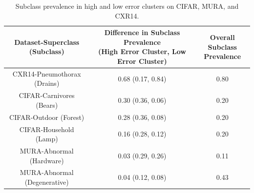\documentclass[sigconf,anonymous,review]{acmart}
\begin{document}
 \begin{table}[]
 \centering
\begin{tabular}{ccc}
\toprule
 Dataset-Superclass (Subclass) & \makecell{Difference in Subclass Prevalence \\ (High Error Cluster, Low Error Cluster)}  & \makecell{Overall Subclass \\ Prevalence} \\
 \toprule
 CXR14-Pneumothorax (Drains) & 0.68 (0.17, 0.84) & 0.80\\
 CIFAR-Carnivores (Bears) & 0.30 (0.36, 0.06) & 0.20\\
 CIFAR-Outdoor (Forest) & 0.28 (0.36, 0.08) & 0.20\\
 CIFAR-Household (Lamp) & 0.16 (0.28, 0.12) & 0.20\\
 MURA-Abnormal (Hardware) & 0.03 (0.29, 0.26) & 0.11\\
 MURA-Abnormal (Degenerative) & 0.04 (0.12, 0.08) & 0.43\\
 \toprule
\end{tabular}
\caption{ Subclass prevalence in high and low error clusters on CIFAR, MURA, and CXR14.}
\label{tab:clustercifar-1}
\end{table}


%
\end{document}
